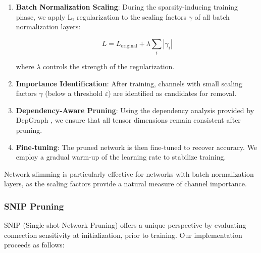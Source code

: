 \documentclass[12pt,a4paper]{article}
\begin{document}
\begin{enumerate}
\item \textbf{Batch Normalization Scaling}: During the sparsity-inducing training phase, we apply L₁ regularization to the scaling factors $\gamma$ of all batch normalization layers:
   
   \begin{equation}
   L = L_{\textrm{original}} + \lambda \sum_{i}|\gamma_i|
   \end{equation}
   
   where $\lambda$ controls the strength of the regularization.

\item \textbf{Importance Identification}: After training, channels with small scaling factors $\gamma$ (below a threshold $\varepsilon$) are identified as candidates for removal.

\item \textbf{Dependency-Aware Pruning}: Using the dependency analysis provided by DepGraph \cite{Fang2023DepGraph}, we ensure that all tensor dimensions remain consistent after pruning.

\item \textbf{Fine-tuning}: The pruned network is then fine-tuned to recover accuracy. We employ a gradual warm-up of the learning rate to stabilize training.
\end{enumerate}

Network slimming is particularly effective for networks with batch normalization layers, as the scaling factors provide a natural measure of channel importance.

\subsubsection{SNIP Pruning}

SNIP (Single-shot Network Pruning) \cite{Lee2019SNIP} offers a unique perspective by evaluating connection sensitivity at initialization, prior to training. Our implementation proceeds as follows:
\end{document}
